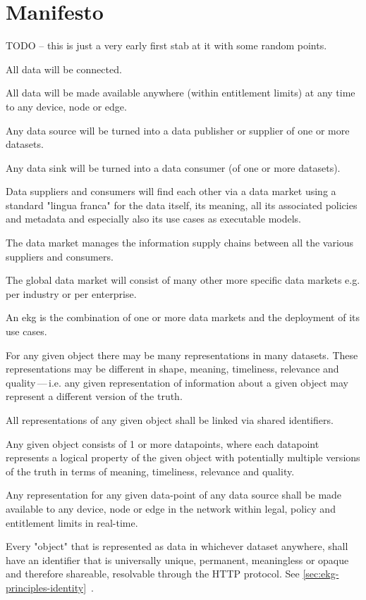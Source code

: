 \chapter{Manifesto}\label{ch:ekg-manifesto}

TODO -- this is just a very early first stab at it with some random points.

All data will be connected.

All data will be made available anywhere (within entitlement limits) at any time to any device, node or edge.

Any data source will be turned into a data publisher or supplier of one or more datasets.

Any data sink will be turned into a data consumer (of one or more datasets).

Data suppliers and consumers will find each other via a data market using a standard "lingua franca" for the
data itself, its meaning, all its associated policies and metadata and especially also its use cases as executable
models.

The data market manages the information supply chains between all the various suppliers and consumers.

The global data market will consist of many other more specific data markets e.g. per industry or per enterprise.

An \gls{ekg} is the combination of one or more data markets and the deployment of its use cases.

For any given object there may be many representations in many datasets.
These representations may be different in shape, meaning, timeliness, relevance and quality\,---\,i.e.
any given representation of information about a given object may represent a
different version of the truth.

All representations of any given object shall be linked via shared identifiers.

Any given object consists of 1 or more datapoints, where each datapoint represents a logical property of the given
object with potentially multiple versions of the truth in terms of meaning, timeliness, relevance and quality.

Any representation for any given \gls{data-point} of any data source shall be made available to any device,
node or edge in the network within legal, policy and entitlement limits in real-time.

Every "object" that is represented as data in whichever dataset anywhere, shall have an identifier that is universally
unique, permanent, meaningless or opaque and therefore shareable, resolvable through the HTTP protocol.
See \ref{sec:ekg-principles-identity}~.


